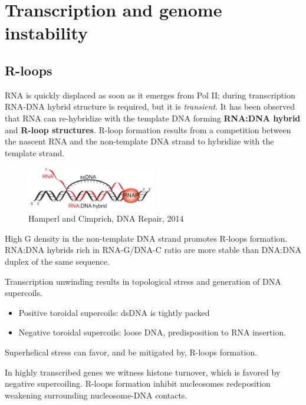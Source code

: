 \graphicspath{{chapters/_resources/}}

\chapter{Transcription and genome instability}


\hypertarget{r-loops}{%
\section{R-loops}\label{r-loops}}

RNA is quickly displaced as soon as it emerges from Pol II; during transcription RNA-DNA hybrid structure is required, but it is \emph{transient}. It has been observed that RNA can re-hybridize with the template DNA forming \textbf{RNA:DNA hybrid} and \textbf{R-loop structures}. R-loop formation results from a competition between the nascent RNA and the non-template DNA strand to hybridize with the template strand.

\begin{figure}
\centering
\includegraphics[width=0.5\textwidth]{../_resources/Screen_Shot_2022-11-23_at_09-53-33.png}
\caption{Hamperl and Cimprich, DNA Repair, 2014}
\end{figure}

High G density in the non-template DNA strand promotes R-loops formation. RNA:DNA hybrids rich in RNA-G/DNA-C ratio are more stable than DNA:DNA duplex of the same sequence.

Transcription unwinding results in topological stress and generation of DNA supercoils.

\begin{itemize}
\tightlist
\item
  Positive toroidal supercoils: dsDNA is tightly packed
\item
  Negative toroidal supercoils: loose DNA, predisposition to RNA insertion.
\end{itemize}

Superhelical stress can favor, and be mitigated by, R-loops formation.

In highly transcribed genes we witness histone turnover, which is favored by negative supercoiling. R-loops formation inhibit nucleosomes redeposition weakening surrounding nucleosome-DNA contacts.

